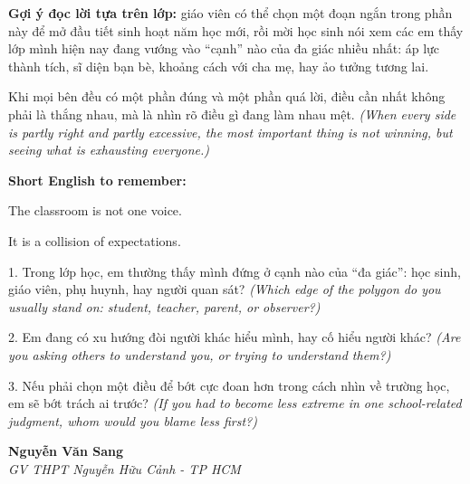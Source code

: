 \begin{goigiaovien}
\textbf{Gợi ý đọc lời tựa trên lớp:} giáo viên có thể chọn một đoạn ngắn trong phần này để mở đầu tiết sinh hoạt năm học mới, rồi mời học sinh nói xem các em thấy lớp mình hiện nay đang vướng vào ``cạnh'' nào của đa giác nhiều nhất: áp lực thành tích, sĩ diện bạn bè, khoảng cách với cha mẹ, hay ảo tưởng tương lai.
\end{goigiaovien}

\begin{baihoc}
Khi mọi bên đều có một phần đúng và một phần quá lời, điều cần nhất không phải là thắng nhau, mà là nhìn rõ điều gì đang làm nhau mệt.
\textit{(When every side is partly right and partly excessive, the most important thing is not winning, but seeing what is exhausting everyone.)}
\end{baihoc}

\begin{ghinhoanh}
\textbf{Short English to remember:}

The classroom is not one voice.

It is a collision of expectations.
\end{ghinhoanh}

\begin{tuhocnhanh}
1. Trong lớp học, em thường thấy mình đứng ở cạnh nào của ``đa giác'': học sinh, giáo viên, phụ huynh, hay người quan sát? \textit{(Which edge of the polygon do you usually stand on: student, teacher, parent, or observer?)}

2. Em đang có xu hướng đòi người khác hiểu mình, hay cố hiểu người khác? \textit{(Are you asking others to understand you, or trying to understand them?)}

3. Nếu phải chọn một điều để bớt cực đoan hơn trong cách nhìn về trường học, em sẽ bớt trách ai trước? \textit{(If you had to become less extreme in one school-related judgment, whom would you blame less first?)}
\end{tuhocnhanh}

\begin{flushright}
\textbf{Nguyễn Văn Sang}\\
\textit{GV THPT Nguyễn Hữu Cảnh - TP HCM}
\end{flushright}

\ngancach
